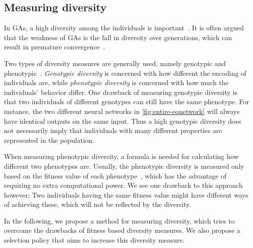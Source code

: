 \subsection{Measuring diversity}
In GAs, a high diversity among the individuals is important~\cite{1266373, Zitzler00comparisonof}. It is often argued that the weakness of GAs is the fall in diversity over generations, which can result in premature convergence~\cite{diaz2007empirical}.

Two types of diversity measures are generally used, namely genotypic and phenotypic~\cite{Nguyen:2006:ASPGP}. \emph{Genotypic diversity} is concerned with how different the encoding of individuals are, while \emph{phenotypic diversity} is concerned with how much the individuals' behavior differ. One drawback of measuring genotypic diversity is that two individuals of different genotypes can still have the same phenotype. For instance, the two different neural networks in \cref{fig:entire-eqnetwork} will always have identical outputs on the same input. Thus a high genotypic diversity does not necessarily imply that individuals with many different properties are represented in the population.
%

%
When measuring phenotypic diversity, a formula is needed for calculating how different two phenotypes are.
Usually, the phenotypic diversity is measured only based on the fitness value of each phenotype~\cite{Nguyen:2006:ASPGP}, which has the advantage of requiring no extra computational power. 
We see one drawback to this approach however; Two individuals having the same fitness value might have different ways of achieving these, which will not be reflected by the diversity. 

In the following, we propose a method for measuring diversity, which tries to overcome the drawbacks of fitness based diversity measures. We also propose a selection policy that aims to increase this diversity measure.
